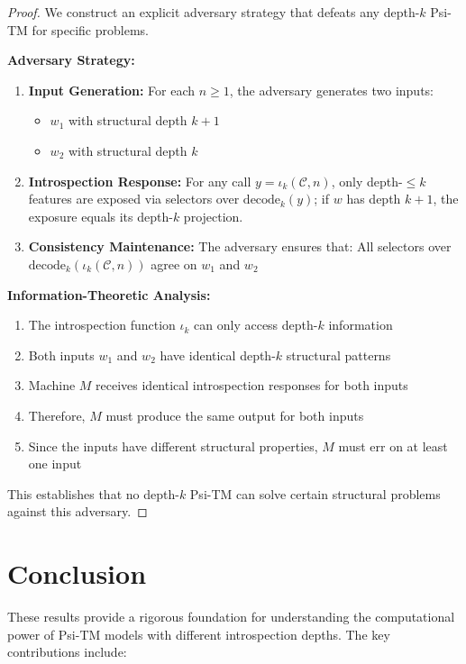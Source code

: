 \documentclass[11pt]{article}
\begin{document}
\begin{proof}
We construct an explicit adversary strategy that defeats any depth-$k$ Psi-TM for specific problems.

\textbf{Adversary Strategy:}
\begin{enumerate}
\item \textbf{Input Generation:} For each $n \geq 1$, the adversary generates two inputs:
  \begin{itemize}
  \item $w_1$ with structural depth $k+1$
  \item $w_2$ with structural depth $k$
  \end{itemize}

\item \textbf{Introspection Response:} For any call $y=\iota_k(\mathcal{C},n)$, only depth-$\le k$ features are exposed via selectors over $\mathrm{decode}_k(y)$; if $w$ has depth $k{+}1$, the exposure equals its depth-$k$ projection.

\item \textbf{Consistency Maintenance:} The adversary ensures that:
All selectors over $\mathrm{decode}_k(\iota_k(\mathcal{C},n))$ agree on $w_1$ and $w_2$
\end{enumerate}

\textbf{Information-Theoretic Analysis:}
\begin{enumerate}
\item The introspection function $\iota_k$ can only access depth-$k$ information
\item Both inputs $w_1$ and $w_2$ have identical depth-$k$ structural patterns
\item Machine $M$ receives identical introspection responses for both inputs
\item Therefore, $M$ must produce the same output for both inputs
\item Since the inputs have different structural properties, $M$ must err on at least one input
\end{enumerate}

This establishes that no depth-$k$ Psi-TM can solve certain structural problems against this adversary.
\end{proof}

\section{Conclusion}

These results provide a rigorous foundation for understanding the computational power of Psi-TM models with different introspection depths. The key contributions include:
\end{document}
